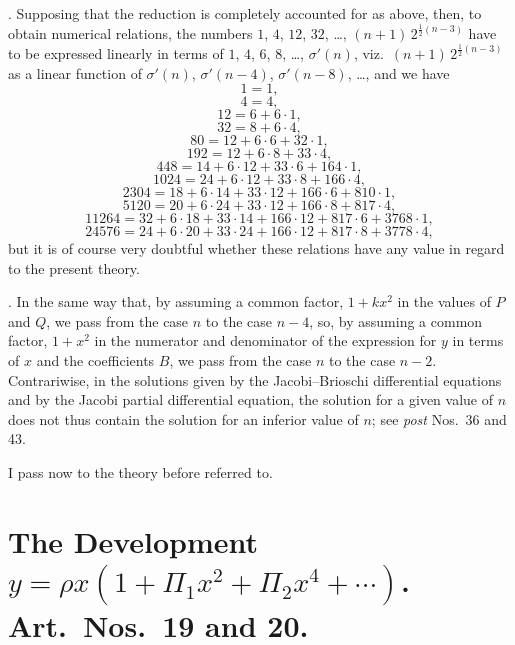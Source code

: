 \documentclass[11pt]{article}
\begin{document}
\medskip

. Supposing that the reduction is completely accounted for as above, then, to obtain numerical relations, the numbers $1$, $4$, $12$, $32$, \ldots, $(n+1)\,2^{\frac{1}{2}(n-3)}$ have to be expressed linearly in terms of $1$, $4$, $6$, $8$, \ldots, $\sigma'(n)$, viz.\ $(n+1)\,2^{\frac{1}{2}(n-3)}$ as a linear function of $\sigma'(n)$, $\sigma'(n-4)$, $\sigma'(n-8)$, \ldots, and we have
\[
1 = 1,
\]
\[
4 = 4,
\]
\[
12 = 6 + 6\cdot 1,
\]
\[
32 = 8 + 6\cdot 4,
\]
\[
80 = 12 + 6\cdot 6 + 32\cdot 1,
\]
\[
192 = 12 + 6\cdot 8 + 33\cdot 4,
\]
\[
448 = 14 + 6\cdot 12 + 33\cdot 6 + 164\cdot 1,
\]
\[
1024 = 24 + 6\cdot 12 + 33\cdot 8 + 166\cdot 4,
\]
\[
2304 = 18 + 6\cdot 14 + 33\cdot 12 + 166\cdot 6 + 810\cdot 1,
\]
\[
5120 = 20 + 6\cdot 24 + 33\cdot 12 + 166\cdot 8 + 817\cdot 4,
\]
\[
11264 = 32 + 6\cdot 18 + 33\cdot 14 + 166\cdot 12 + 817\cdot 6 + 3768\cdot 1,
\]
\[
24576 = 24 + 6\cdot 20 + 33\cdot 24 + 166\cdot 12 + 817\cdot 8 + 3778\cdot 4,
\]
but it is of course very doubtful whether these relations have any value in regard to the present theory.

\newpage

. In the same way that, by assuming a common factor, $1 + kx^2$ in the values of $P$ and $Q$, we pass from the case $n$ to the case $n-4$, so, by assuming a common factor, $1 + x^2$ in the numerator and denominator of the expression for $y$ in terms of $x$ and the coefficients $B$, we pass from the case $n$ to the case $n-2$. Contrariwise, in the solutions given by the Jacobi--Brioschi differential equations and by the Jacobi partial differential equation, the solution for a given value of $n$ does not thus contain the solution for an inferior value of $n$; see \textit{post} Nos.\ 36 and 43.

\medskip

\noindent I pass now to the theory before referred to.

\bigskip

\section*{The Development $y = \rho x(1 + \Pi_1 x^2 + \Pi_2 x^4 + \cdots)$. Art.\ Nos.\ 19 and 20.}
\end{document}
